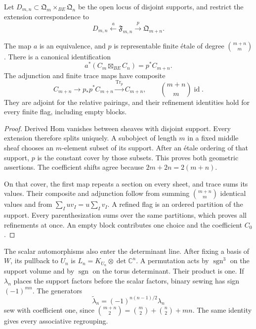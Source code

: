 Let $D_{m,n}\subset\mathfrak Q_m\times_{BE}\mathfrak Q_n$ be
the open locus of disjoint supports, and restrict the extension
correspondence to
\[
 D_{m,n}\xleftarrow{\ a\ }\mathfrak F_{m,n}
 \xrightarrow{\ p\ }\mathfrak Q_{m+n}.
\]

\begin{proposition}\label{cycompact:prop:disjoint}
The map $a$ is an equivalence, and $p$ is representable finite
\'{e}tale of degree $\binom{m+n}{m}$. There is a canonical
identification
\[
 a^*(C_m\boxtimes_{BE}C_n)=p^*C_{m+n}.
\]
The adjunction and finite trace maps have composite
\[
 C_{m+n}\longrightarrow p_*p^*C_{m+n}
 \xrightarrow{\operatorname{Tr}_p}C_{m+n},
 \qquad \binom{m+n}{m}\operatorname{id}.
\]
They are adjoint for the relative pairings, and their refinement
identities hold for every finite flag, including empty blocks.
\end{proposition}

\begin{proof}
Derived Hom vanishes between sheaves with disjoint support.
Every extension therefore splits uniquely. A subobject of length
$m$ in a fixed middle sheaf chooses an $m$-element subset of its
support. After an \'{e}tale ordering of that support, $p$ is the
constant cover by those subsets. This proves both geometric
assertions. The coefficient shifts agree because
$2m+2n=2(m+n)$.

On that cover, the first map repeats a section on every sheet,
and trace sums its values. Their composite and adjunction follow
from summing $\binom{m+n}{m}$ identical values and from
$\sum_I uv_I=u\sum_Iv_I$. A refined flag is an ordered partition
of the support. Every parenthesization sums over the same
partitions, which proves all refinements at once. An empty block
contributes one choice and the coefficient $C_0$.
\end{proof}

The scalar automorphisms also enter the determinant line. After
fixing a basis of $W$, its pullback to $U_n$ is
$L_n=K_{U_n}\otimes\det\mathbb C^n$. A permutation acts by
$\operatorname{sgn}^3$ on the support volume and by
$\operatorname{sgn}$ on the torus determinant. Their product is
one. If $\lambda_n$ places the support factors before the scalar
factors, binary sewing has sign $(-1)^{mn}$. The generators
\begin{equation}\label{cycompact:eq:disjoint-sign}
 \widetilde\lambda_n=(-1)^{n(n-1)/2}\lambda_n
\end{equation}
sew with coefficient one, since
$\binom{m+n}{2}=\binom m2+\binom n2+mn$.
The same identity gives every associative regrouping.

